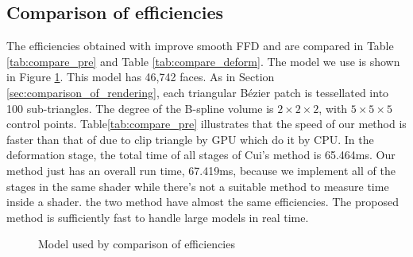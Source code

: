 \documentclass[3p]{elsarticle}
\begin{document}
\subsection{Comparison of efficiencies}

The efficiencies obtained with improve smooth FFD and \cite{Cui15} are compared in Table \ref{tab:compare_pre} and Table \ref{tab:compare_deform}. The model we use is shown in Figure \ref{fig:snail}. This model has 46,742 faces. As in Section \ref{sec:comparison_of_rendering}, each triangular B\'ezier patch is tessellated into 100 sub-triangles. The degree of the B-spline volume is $2\times2\times2$, with $5\times5\times5$ control points. Table\ref{tab:compare_pre} illustrates that the speed of our method is faster than that of \cite{Cui15} due to clip triangle by GPU which \cite{Cui15} do it by CPU. In the deformation stage, the total time of all stages of Cui's method is 65.464ms. Our method just has an overall run time, 67.419ms, because we implement all of the stages in the same shader while there's not a suitable method to measure time inside a shader. the two method have almost the same efficiencies. The proposed method is sufficiently fast to handle large models in real time.

\begin{figure}
  \centering
  \hfill
  \hfill
  \caption{Model used by comparison of efficiencies}
  \label{fig:snail}
\end{figure}
\end{document}
